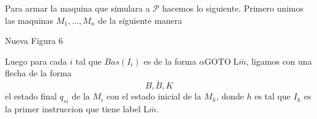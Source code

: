 \begin{frame}
  Para armar la maquina que simulara a $\mathcal{P}$ hacemos lo siguiente.
Primero unimos las maquinas $M_{1},...,M_{n}$ de la siguiente manera

\bigskip

\bigskip

\bigskip

\bigskip

Nueva Figura 6

\bigskip

\bigskip

\bigskip

\bigskip

\noindent Luego para cada $i$ tal que $Bas(I_{i})$ es de la forma $\alpha
\mathrm{GOTO}\;\mathrm{L}\bar{m}$, ligamos con una flecha de la forma%
\begin{equation*}
\underrightarrow{\;\;\;\;\;\;B,B,K\;\;\;\;\;\;}
\end{equation*}%
el estado final $q_{si}$ de la $M_{i}$ con el estado inicial de la $M_{h}$,
donde $h$ es tal que $I_{h}$ es la primer instruccion que tiene label $%
\mathrm{L}\bar{m}$.
\end{frame}
